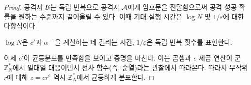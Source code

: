 \begin{proof}
    공격자 $\mathcal{B}$는 독립 반복으로 공격자 $\mathcal{A}$에게 암호문을 전달함으로써 공격
    성공 확률을 원하는 수준까지 끌어올릴 수 있다. 이때 기대 실행 시간은 $\log N$
    및 $1/\varepsilon$에 대한 다항식이다.

    \begin{memo}
        $\log N$은 $c'$과 $\alpha^{-1}$을 계산하는 데 걸리는 시간,
        $1/\varepsilon$은 독립 반복 횟수를 표현한다.
    \end{memo}

    이제 $c'$이 균등분포를 만족함을 보이고 증명을 마친다. 이는 곱셈과 $e$ 제곱
    연산이 군 $\mathbb{Z}_N^*$에서 일대일 대응이면서 전사 함수(즉, 순열)라는
    관찰에서 따라온다. 따라서 무작위 $r$에 대해 $z = cr^e$ 역시
    $\mathbb{Z}_N^*$에서 균등하게 분포한다.
\end{proof}





